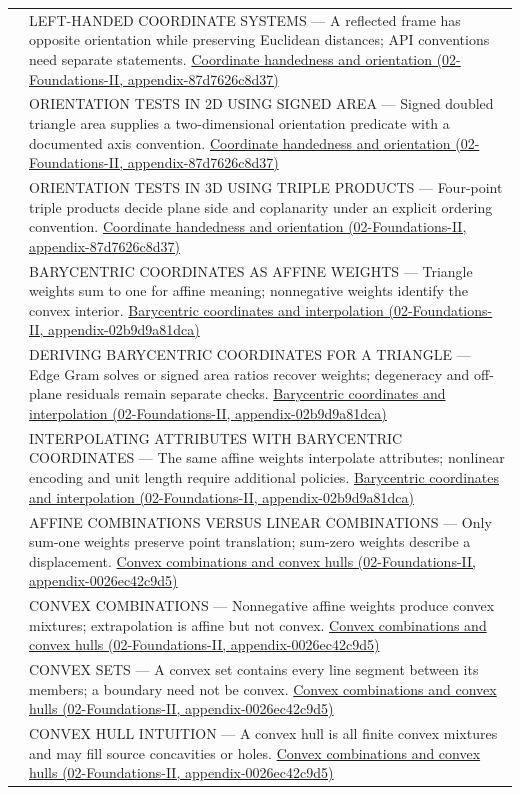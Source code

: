 {\begin{longtable}[]{@{}
  >{\raggedright\arraybackslash}p{}
  >{\raggedright\arraybackslash}p{}@{}}
565 & LEFT-HANDED COORDINATE SYSTEMS --- A reflected frame has opposite orientation while preserving Euclidean distances; API conventions need separate statements. \href{}{Coordinate handedness and orientation (02-Foundations-II, appendix-87d7626c8d37)} \\
566 & ORIENTATION TESTS IN 2D USING SIGNED AREA --- Signed doubled triangle area supplies a two-dimensional orientation predicate with a documented axis convention. \href{}{Coordinate handedness and orientation (02-Foundations-II, appendix-87d7626c8d37)} \\
567 & ORIENTATION TESTS IN 3D USING TRIPLE PRODUCTS --- Four-point triple products decide plane side and coplanarity under an explicit ordering convention. \href{}{Coordinate handedness and orientation (02-Foundations-II, appendix-87d7626c8d37)} \\
568 & BARYCENTRIC COORDINATES AS AFFINE WEIGHTS --- Triangle weights sum to one for affine meaning; nonnegative weights identify the convex interior. \href{}{Barycentric coordinates and interpolation (02-Foundations-II, appendix-02b9d9a81dca)} \\
569 & DERIVING BARYCENTRIC COORDINATES FOR A TRIANGLE --- Edge Gram solves or signed area ratios recover weights; degeneracy and off-plane residuals remain separate checks. \href{}{Barycentric coordinates and interpolation (02-Foundations-II, appendix-02b9d9a81dca)} \\
570 & INTERPOLATING ATTRIBUTES WITH BARYCENTRIC COORDINATES --- The same affine weights interpolate attributes; nonlinear encoding and unit length require additional policies. \href{}{Barycentric coordinates and interpolation (02-Foundations-II, appendix-02b9d9a81dca)} \\
571 & AFFINE COMBINATIONS VERSUS LINEAR COMBINATIONS --- Only sum-one weights preserve point translation; sum-zero weights describe a displacement. \href{}{Convex combinations and convex hulls (02-Foundations-II, appendix-0026ec42c9d5)} \\
572 & CONVEX COMBINATIONS --- Nonnegative affine weights produce convex mixtures; extrapolation is affine but not convex. \href{}{Convex combinations and convex hulls (02-Foundations-II, appendix-0026ec42c9d5)} \\
573 & CONVEX SETS --- A convex set contains every line segment between its members; a boundary need not be convex. \href{}{Convex combinations and convex hulls (02-Foundations-II, appendix-0026ec42c9d5)} \\
574 & CONVEX HULL INTUITION --- A convex hull is all finite convex mixtures and may fill source concavities or holes. \href{}{Convex combinations and convex hulls (02-Foundations-II, appendix-0026ec42c9d5)} \\

\end{longtable}}
